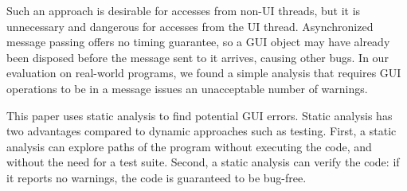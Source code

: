 Such an approach is desirable for accesses from non-UI threads, but it is unnecessary
and dangerous for accesses from the UI thread. Asynchronized message passing offers
no timing guarantee, so a GUI object may have already been
disposed before the message sent to it arrives, causing other bugs. 
In our evaluation on real-world programs, we found a simple analysis that
requires GUI operations to be in a message issues
an unacceptable number of warnings. %




This paper uses static analysis to find potential GUI errors.
Static analysis has two advantages compared to dynamic approaches such as
 testing. First, a static analysis can explore paths of the program without
executing the code, and without the need for a test suite.
Second, a static analysis can verify the code: if it
reports no warnings, the code is guaranteed to be bug-free. 


